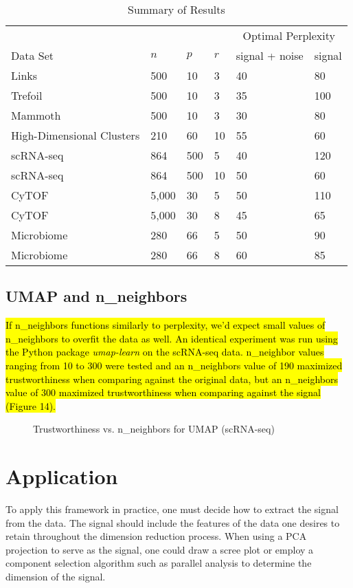 \documentclass{article}
\begin{document}
\begin{table}[H]
\centering
\begin{tabular}{@{}llllll@{}}
\toprule 
 & & & & \multicolumn{2}{c}{Optimal Perplexity} \\
\cmidrule{5-6}
Data Set & $n$ & $p$ & $r$ & signal + noise & signal \\
\midrule 
Links \cite{Distill} & 500 & 10 & 3 & 40 & 80 \\
Trefoil \cite{Distill} & 500 & 10 & 3 & 35 & 100 \\
Mammoth \cite{understanding DR} & 500 & 10 & 3 & 30 & 80 \\
High-Dimensional Clusters & 210 & 60 & 10 & 55 & 60 \\
scRNA-seq \cite{scRNA data} & 864 & 500 & 5 & 40 & 120 \\
scRNA-seq \cite{scRNA data} & 864 & 500 & 10 & 50 & 60 \\
CyTOF \cite{CyTOF data} & 5,000 & 30 & 5 & 50 & 110 \\
CyTOF \cite{CyTOF data} & 5,000 & 30 & 8 & 45 & 65 \\
Microbiome \cite{enterotype data} & 280 & 66 & 5 & 50 & 90 \\
Microbiome \cite{enterotype data} & 280 & 66 & 8 & 60 & 85 \\
\bottomrule
\end{tabular}
\caption{Summary of Results}
\end{table}

\subsection{UMAP and n\_neighbors}
\hl{If n\_neighbors functions similarly to perplexity, we'd expect small values of n\_neighbors to overfit the data as well. An identical experiment was run using the Python package \textit{umap-learn} {\cite{umap}} on the scRNA-seq data. n\_neighbor values ranging from 10 to 300 were tested and an n\_neighbors value of 190 maximized trustworthiness when comparing against the original data, but an n\_neighbors value of 300 maximized trustworthiness when comparing against the signal (Figure 14).}

\renewcommand{\thefigure}{14}
\begin{figure}[H]
\centering
\caption{Trustworthiness vs. n\_neighbors for UMAP (scRNA-seq)}
\end{figure}

\section{Application}
To apply this framework in practice, one must decide how to extract the signal from the data. The signal should include the features of the data one desires to retain throughout the dimension reduction process. When using a PCA projection to serve as the signal, one could draw a scree plot or employ a component selection algorithm such as parallel analysis \cite{parallel analysis} to determine the dimension of the signal.
\end{document}
